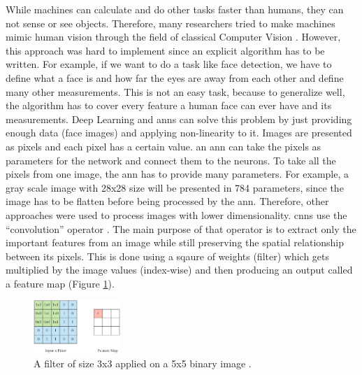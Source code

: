 \documentclass[runningheads]{llncs}
\begin{document}
While machines can calculate and do other tasks faster than humans,
they can not sense or see objects. Therefore, many researchers
tried to make machines mimic human vision through the field of classical Computer Vision \cite{hoffmann1992computer}.
However, this approach was hard to implement since an explicit algorithm 
has to be written. For example, if we want to do a task like
face detection, we have to define what a face is and how
far the eyes are away from each other and define many other measurements. This is not 
an easy task, because to generalize well, the algorithm has to 
cover every feature a human face can ever have and its measurements. Deep Learning 
and \gls{anns} can solve this problem by just providing enough data
(face images) and applying non-linearity to it.
Images are presented as pixels and each pixel has a certain value.
an \gls{ann} can take the pixels as parameters for the network 
and connect them to the neurons. To take all the pixels from
one image, the \gls{ann} has to provide many parameters. For example,
a gray scale image with 28x28 size will be presented in 784 parameters, 
since the image has to be flatten before being processed by the \gls{ann}.
Therefore, other approaches were used to process images with lower dimensionality.
\gls{cnns} use the “convolution” operator \cite{lecun1998gradient}. The main purpose of that 
operator is to extract only the important features from an image while
still preserving the spatial relationship between its pixels. This is 
done using a sqaure of weights (filter) which
gets multiplied by the image values (index-wise) and then producing an output called a feature map (Figure \ref{fm}).


\begin{figure}[H]
    \label{fm}
    \centering
    \includegraphics[height=2cm]{filter}
    \caption{A filter of size 3x3 applied on a 5x5 binary image \cite{appf}.}
\end{figure}

\end{document}

